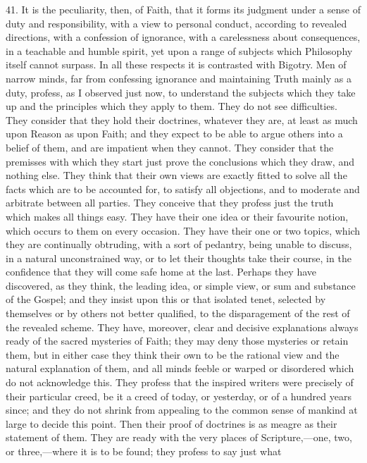 41. It is the peculiarity, then, of Faith, that it forms its
judgment under a sense of duty and responsibility, with a view to
personal conduct, according to revealed directions, with a confession
of ignorance, with a carelessness about consequences, in a teachable
and humble spirit, yet upon a range of subjects which Philosophy
itself cannot surpass. In all these respects it is contrasted with
Bigotry. Men of narrow minds, far from confessing ignorance and
maintaining Truth mainly as a duty, profess, as I observed just now,
to understand the subjects which they take up and the principles which
they apply to them. They do not see difficulties. They consider that
they hold their doctrines, whatever they are, at least as much upon
Reason as upon Faith; and they expect to be able to argue others into
a belief of them, and are impatient when they cannot. They consider
that the premisses with which they start just prove the conclusions
which they draw, and nothing else. They think that their own views are
exactly fitted to solve all the facts which are to be accounted for,
to satisfy all objections, and to moderate and arbitrate between all
parties. They conceive that they profess just the truth which makes
all things easy. They have their one idea or their favourite notion,
which occurs to them on every occasion. They have their one or two
topics, which they are continually obtruding, with a sort of pedantry,
being unable to discuss, in a natural unconstrained way, or to let
their thoughts take their course, in the confidence that they will
come safe home at the last. Perhaps they have discovered, as they
think, the leading idea, or simple view, or sum and substance of the
Gospel; and they insist upon this or that isolated tenet, selected by
themselves or by others not better qualified, to the disparagement of
the rest of the revealed scheme. They have, moreover, clear and
decisive explanations always ready of the sacred mysteries of Faith;
they may deny those mysteries or retain them, but in either case they
think their own to be the rational view and the natural explanation of
them, and all minds feeble or warped or disordered which do not
acknowledge this. They profess that the inspired writers were
precisely of their particular creed, be it a creed of today, or
yesterday, or of a hundred years since; and they do not shrink from
appealing to the common sense of mankind at large to decide this
point. Then their proof of doctrines is as meagre as their statement
of them. They are ready with the very places of Scripture,—one, two,
or three,—where it is to be found; they profess to say just what
